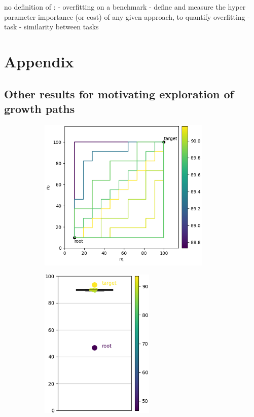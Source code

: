 \documentclass{article}
\begin{document}
no definition of :
- overfitting on a benchmark
    - define and measure the hyper parameter importance (or cost) of any given approach, to quantify overfitting
- task
- similarity between tasks

\nocite{*}
\printbibliography


\section*{Appendix}
\subsection{Other results for motivating exploration of growth paths}

\begin{figure}[htbp]
    \centering
    \begin{subfigure}[b]{0.29\textwidth}
        \centering
        \includegraphics[width=0.9\textwidth]{imgs/pathes_MNIST_random_2024_05_02_14_52_58.png}
    \end{subfigure}
    \begin{subfigure}[b]{0.29\textwidth}
        \centering
        \includegraphics[width=0.6\textwidth]{imgs/box_plot_MNIST_random_2024_05_02_14_52_58.png}

\end{subfigure}
\end{figure}
\end{document}
